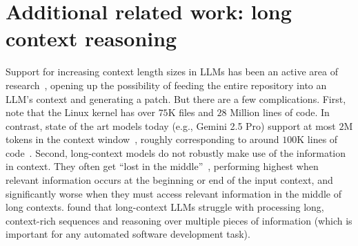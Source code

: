 \section{Additional related work: long context reasoning}
\label{app:long-context}

Support for increasing context length sizes in LLMs has been an active area of research~\citep{google-long-context,longcoder},
opening up the possibility of feeding the entire repository into an LLM's context and generating a patch. But there are a few complications.
First, note that the Linux kernel has over $75$K files and $28$ Million lines of code.
In contrast, state of the art models today (e.g., Gemini 2.5 Pro) support at most $2$M tokens in the context window~\citep{google-long-context-docs,google-long-context-docs-gemini2.5}, roughly corresponding to around $100$K lines of code~\citep{google-long-context-docs}.
Second, long-context models do not robustly make use of the information in context. They often get ``lost in the middle''~\citep{lost-in-the-middle}, performing highest when relevant information occurs at the beginning or end of the input context, and significantly worse when they must access relevant information in the middle of long contexts.
 found that long-context LLMs struggle with processing long, context-rich sequences and reasoning over multiple pieces of information (which is important for any automated software development task).
